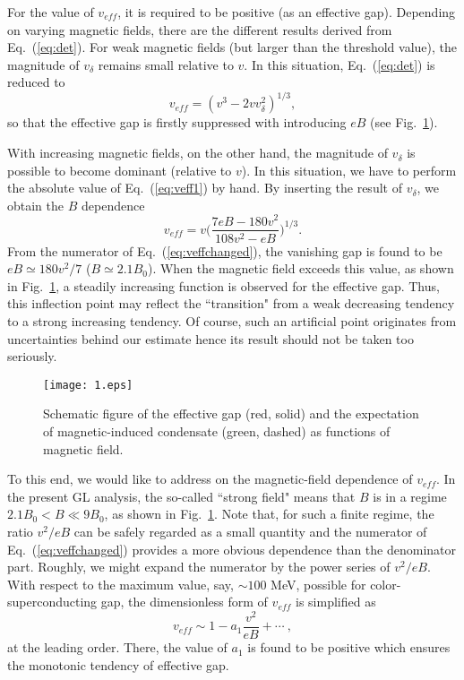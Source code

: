 For the value of $v_{eff}$, it is required to be positive (as an effective gap).
Depending on varying magnetic fields, there are the different results derived from Eq.~(\ref{eq:det}).
For weak magnetic fields (but larger than the threshold value), the magnitude of $v_\delta$ remains
small relative to $v$. In this situation, Eq.~(\ref{eq:det}) is reduced to
\begin{equation}
\label{eq:veff1}
v_{eff} =  (v^3-2 vv_\delta^2)^{1/3},
\end{equation}
so that the effective gap is firstly suppressed with introducing $eB$ (see Fig.~\ref{fig:1}).

With increasing magnetic fields, on the other hand, the magnitude of $v_\delta$ is possible to
become dominant (relative to $v$). In this situation, we have to perform the absolute value of
Eq.~(\ref{eq:veff1}) by hand. By inserting the result of $v_\delta$, we obtain the $B$ dependence
\begin{equation}
\label{eq:veffchanged}
v_{eff} = v \Big(\frac{7eB-180v^2}{108v^2-eB}\Big)^{1/3}.
\end{equation}
From the numerator of Eq.~(\ref{eq:veffchanged}), the vanishing gap is found to be $eB\simeq 180v^2/7$
($B \simeq 2.1 B_0$).
When the magnetic field exceeds this value, as shown in Fig.~\ref{fig:1}, a steadily increasing function
is observed for the effective gap. Thus, this inflection point may reflect the ``transition" from a weak
decreasing tendency to a strong increasing tendency. Of course, such an artificial point originates from
uncertainties behind our estimate hence its result should not be taken too seriously.

\begin{figure}[ht]
\centering
\texttt{[image: 1.eps]}


\caption{Schematic figure of the effective gap (red, solid) and the expectation of magnetic-induced condensate (green, dashed) as functions of magnetic field.}
	\label{fig:1}
\end{figure}

To this end, we would like to address on the magnetic-field dependence of $v_{eff}$. In the
present GL analysis, the so-called ``strong field" means that $B$ is in a regime
$2.1 B_0 < B \ll 9 B_0$, as shown in Fig.~\ref{fig:1}. Note that, for such a finite regime,
the ratio $v^2/eB$ can be safely regarded as a small quantity and the numerator of
Eq.~(\ref{eq:veffchanged}) provides a more obvious dependence than the denominator part.
Roughly, we might expand the numerator by the power series of $v^2/eB$. With respect to the
maximum value, say, $\sim 100$ MeV, possible for color-superconducting gap, the dimensionless
form of $v_{eff}$ is simplified as
\begin{equation}\label{eq:expansion1}
 v_{eff} \sim 1 - a_1 \frac{v^2}{eB} + \cdots \ ,
\end{equation}
at the leading order. There, the value of $a_1$ is found to be positive which ensures the
monotonic tendency of effective gap.

